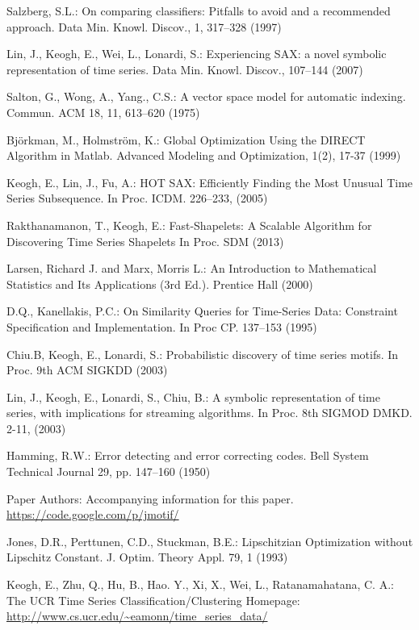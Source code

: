 \documentclass{llncs}
\begin{document}
\begin{thebibliography}{5}
Salzberg, S.L.:
On comparing classifiers: Pitfalls to avoid and a recommended approach. 
Data Min. Knowl. Discov., 1, 317--328 (1997)

Lin, J., Keogh, E., Wei, L., Lonardi, S.:
Experiencing SAX: a novel symbolic representation of time series.
Data Min. Knowl. Discov., 107--144 (2007)

Salton, G., Wong, A., Yang., C.S.:
A vector space model for automatic indexing. 
Commun. ACM 18, 11, 613--620 (1975)

Björkman, M., Holmström, K.:
Global Optimization Using the DIRECT Algorithm in Matlab.
Advanced Modeling and Optimization, 1(2), 17-37 (1999)

Keogh, E., Lin, J., Fu, A.:
HOT SAX: Efficiently Finding the Most Unusual Time Series Subsequence. 
In Proc. ICDM. 226--233, (2005)

Rakthanamanon, T., Keogh, E.:
Fast-Shapelets: A Scalable Algorithm for Discovering Time Series Shapelets
In Proc. SDM (2013)

Larsen, Richard J. and Marx, Morris L.:
An Introduction to Mathematical Statistics and Its Applications (3rd Ed.).
Prentice Hall (2000)

D.Q., Kanellakis, P.C.:
On Similarity Queries for Time-Series Data: Constraint Specification and Implementation. 
In Proc CP. 137--153 (1995)

Chiu.B, Keogh, E., Lonardi, S.:
Probabilistic discovery of time series motifs. 
In Proc. 9th ACM SIGKDD (2003)

Lin, J., Keogh, E., Lonardi, S., Chiu, B.:
A symbolic representation of time series, with implications for streaming algorithms. 
In Proc. 8th SIGMOD DMKD. 2-11, (2003)

Hamming, R.W.:
Error detecting and error correcting codes. 
Bell System Technical Journal 29, pp. 147--160 (1950)

Paper Authors:
Accompanying information for this paper. 
\url{https://code.google.com/p/jmotif/}

Jones, D.R., Perttunen, C.D., Stuckman, B.E.:
Lipschitzian Optimization without Lipschitz Constant.
J. Optim. Theory Appl. 79, 1 (1993)

Keogh, E., Zhu, Q., Hu, B., Hao. Y.,  Xi, X., Wei, L., Ratanamahatana, C. A.:
The UCR Time Series Classification/Clustering Homepage:
\url{http://www.cs.ucr.edu/~eamonn/time_series_data/}


\end{thebibliography}
\end{document}
